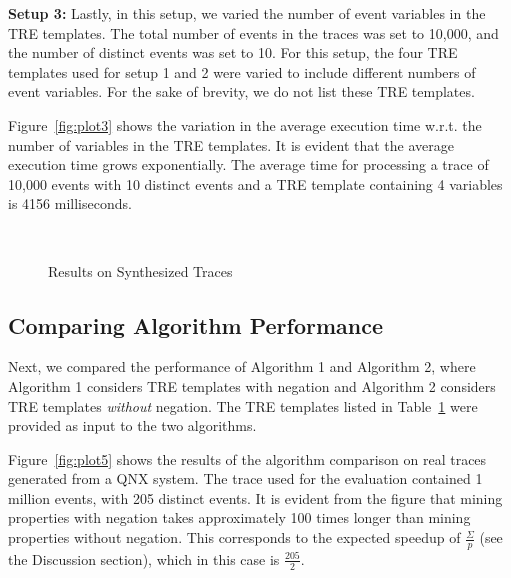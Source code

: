 \documentclass[]{sigplanconf}
\begin{document}
\vspace{3mm}

\noindent \textbf{Setup 3:}
Lastly, in this setup, we varied the number of event variables in the TRE templates. The total number of events in the traces was set to 10,000, and the number of distinct events was set to 10. For this setup, the four TRE templates used for setup 1 and 2 were varied to include different numbers of event variables. For the sake of brevity, we do not list these TRE templates.

Figure~\ref{fig:plot3} shows the variation in the average execution time w.r.t. the number of variables in the TRE templates.
It is evident that the average execution time grows exponentially. The average time for processing a trace of 10,000 events with 10 distinct events and a TRE template containing 4 variables is 4156 milliseconds.

\begin{figure}[!ht]
  \centering
  \\
  \caption{Results on Synthesized Traces}\label{Algs_synth}
\end{figure}


\subsection{Comparing Algorithm Performance}

Next, we compared the performance of Algorithm 1 and Algorithm 2, where Algorithm 1 considers TRE templates with negation and Algorithm 2 considers TRE templates \emph{without} negation. The TRE templates listed in Table~\ref{Algs_synth} were provided as input to the two algorithms.

Figure~\ref{fig:plot5} shows the results of the algorithm comparison on real traces generated from a QNX system. The trace used for the evaluation contained 1 million events, with 205 distinct events. It is evident from the figure that mining properties with negation takes approximately 100 times longer than mining properties without negation. This corresponds to the expected speedup of $\frac{\Sigma}{p}$ (see the Discussion section), which in this case is $\frac{205}{2}$.
\end{document}
